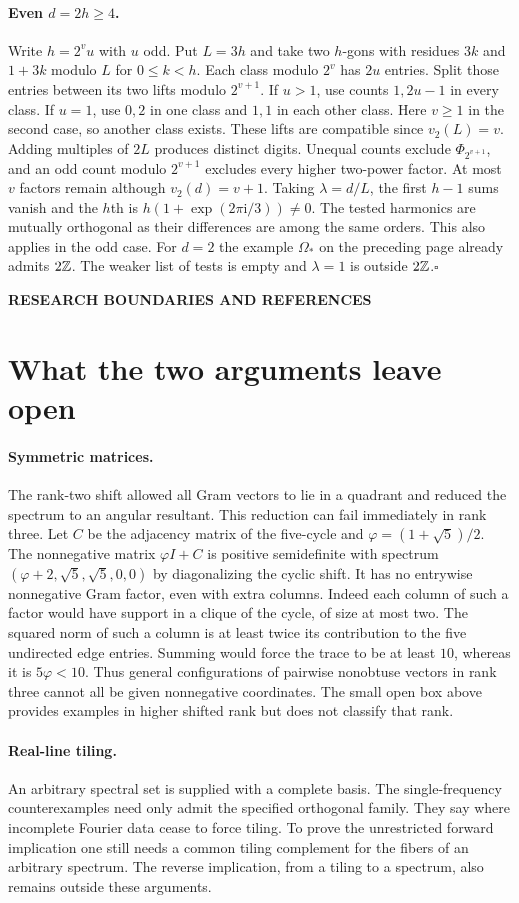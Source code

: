 \documentclass[11pt,a4paper]{article}
\newcommand{\kicker}[1]{\par{\sffamily\bfseries\color{teal}\small #1}\par}
\newcommand{\sect}[1]{\section*{#1}}
\begin{document}
\paragraph{Even $d=2h\ge4$.}
Write $h=2^v u$ with $u$ odd. Put $L=3h$ and take two $h$-gons with residues $3k$ and $1+3k$ modulo $L$ for $0\le k<h$. Each class modulo $2^v$ has $2u$ entries. Split those entries between its two lifts modulo $2^{v+1}$. If $u>1$, use counts $1,2u-1$ in every class. If $u=1$, use $0,2$ in one class and $1,1$ in each other class. Here $v\ge1$ in the second case, so another class exists. These lifts are compatible since $v_2(L)=v$. Adding multiples of $2L$ produces distinct digits. Unequal counts exclude $\Phi_{2^{v+1}}$, and an odd count modulo $2^{v+1}$ excludes every higher two-power factor. At most $v$ factors remain although $v_2(d)=v+1$. Taking $\lambda=d/L$, the first $h-1$ sums vanish and the $h$th is $h(1+\exp(2\pi\mathrm i/3))\ne0$. The tested harmonics are mutually orthogonal as their differences are among the same orders. This also applies in the odd case. For $d=2$ the example $\Omega_*$ on the preceding page already admits $2\mathbb Z$. The weaker list of tests is empty and $\lambda=1$ is outside $2\mathbb Z$.\hfill$\square$
\clearpage
{}
\kicker{RESEARCH BOUNDARIES AND REFERENCES}
\sect{What the two arguments leave open}
\paragraph{Symmetric matrices.} The rank-two shift allowed all Gram vectors to lie in a quadrant and reduced the spectrum to an angular resultant. This reduction can fail immediately in rank three. Let $C$ be the adjacency matrix of the five-cycle and $\varphi=(1+\sqrt5)/2$. The nonnegative matrix $\varphi I+C$ is positive semidefinite with spectrum $(\varphi+2,\sqrt5,\sqrt5,0,0)$ by diagonalizing the cyclic shift. It has no entrywise nonnegative Gram factor, even with extra columns. Indeed each column of such a factor would have support in a clique of the cycle, of size at most two. The squared norm of such a column is at least twice its contribution to the five undirected edge entries. Summing would force the trace to be at least $10$, whereas it is $5\varphi<10$. Thus general configurations of pairwise nonobtuse vectors in rank three cannot all be given nonnegative coordinates. The small open box above provides examples in higher shifted rank but does not classify that rank.
\paragraph{Real-line tiling.} An arbitrary spectral set is supplied with a complete basis. The single-frequency counterexamples need only admit the specified orthogonal family. They say where incomplete Fourier data cease to force tiling. To prove the unrestricted forward implication one still needs a common tiling complement for the fibers of an arbitrary spectrum. The reverse implication, from a tiling to a spectrum, also remains outside these arguments.
\end{document}
